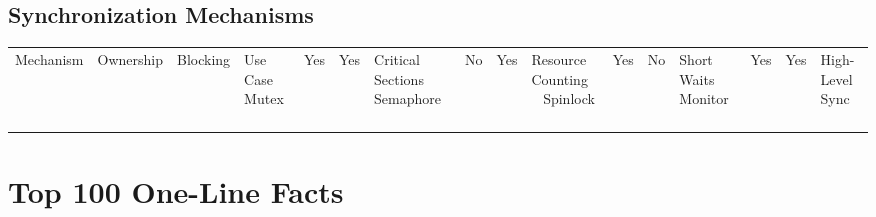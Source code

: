 \subsection*{Synchronization Mechanisms}

\begin{longtable}{|p{4cm}|p{4cm}|p{4cm}|p{4cm}|}
\hline
Mechanism & Ownership & Blocking & Use Case \
\hline
Mutex & Yes & Yes & Critical Sections \
\hline
Semaphore & No & Yes & Resource Counting \
\hline
Spinlock & Yes & No & Short Waits \
\hline
Monitor & Yes & Yes & High-Level Sync \
\hline
\end{longtable}

\section{Top 100 One-Line Facts}

